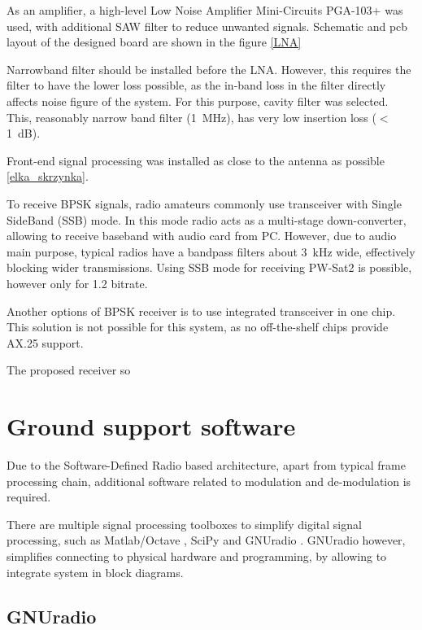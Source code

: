 As an amplifier, a high-level Low Noise Amplifier Mini-Circuits PGA-103+ was used, with additional SAW filter to reduce unwanted signals. Schematic and pcb layout of the designed board are shown in the figure \ref{LNA}


Narrowband filter should be installed before the LNA. However, this requires the filter to have the lower loss possible, as the in-band loss in the filter directly affects noise figure of the system. For this purpose, cavity filter was selected. This, reasonably narrow band filter (\SI{1}{\MHz}), has very low insertion loss ($<$\SI{1}{\dB}).

Front-end signal processing was installed as close to the antenna as possible \ref{elka_skrzynka}.




To receive BPSK signals, radio amateurs commonly use transceiver with Single SideBand  (SSB) mode. In this mode radio acts as a multi-stage down-converter, allowing to receive baseband with audio card from PC. However, due to audio main purpose, typical radios have a bandpass filters about \SI{3}{\kHz} wide, effectively blocking wider transmissions. Using SSB mode for receiving PW-Sat2 is possible, however only for \SI{1.2}{\kbps} bitrate.

Another options of BPSK receiver is to use integrated transceiver in one chip. This solution is not possible for this system, as no off-the-shelf chips provide AX.25 support.

The proposed receiver so



\chapter{Ground support software}
Due to the Software-Defined Radio based architecture, apart from typical frame processing chain, additional software related to modulation and de-modulation is required.

There are multiple signal processing toolboxes to simplify digital signal processing, such as Matlab/Octave \cite{Matlab}, SciPy \cite{Scipy} and GNUradio \cite{Gnuradio}. GNUradio however, simplifies connecting to physical hardware and programming, by allowing to integrate system in block diagrams.

\section{GNUradio}

